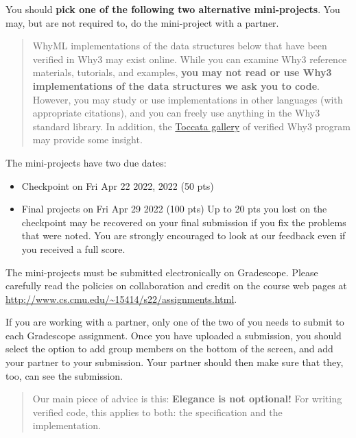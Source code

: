 \documentclass[11pt]{article}
\newcommand{\lecurl}{http://www.cs.cmu.edu/~15414/s22}
\begin{document}
\maketitle

You should \textbf{pick one of the following two alternative
  mini-projects}.  You may, but are not required to, do the mini-project
with a partner.

\begin{quote}
  WhyML implementations of the data structures below that have been
  verified in Why3 may exist online.  While you can examine Why3
  reference materials, tutorials, and examples, \textbf{you may not
    read or use Why3 implementations of the data structures we ask you
    to code}.  However, you may study or use implementations in other
  languages (with appropriate citations), and you can
  freely use anything in the Why3 standard library.  In addition, the
  \href{http://toccata.lri.fr/gallery/why3.en.html}{Toccata gallery}
  of verified Why3 program may provide some insight.
\end{quote}
The mini-projects have two due dates:
\begin{itemize}
\item Checkpoint on Fri Apr 22 2022, 2022 (50 pts)
\item Final projects on Fri Apr 29 2022 (100 pts) \newline
  Up to 20 pts you lost on the checkpoint may be recovered
  on your final submission if you fix the problems that were noted.
  You are strongly encouraged to look at our feedback even if you
  received a full score.
\end{itemize}

The mini-projects must be submitted electronically on Gradescope.
Please carefully read the policies on collaboration and credit on the
course web pages at \url{\lecurl/assignments.html}.

If you are working with a partner, only one of the two of you needs to
submit to each Gradescope assignment.  Once you have uploaded a
submission, you should select the option to add group members on the
bottom of the screen, and add your partner to your submission.  Your
partner should then make sure that they, too, can see the submission.

\begin{quote}
  Our main piece of advice is this: {\color{red}\textbf{Elegance is not
      optional!}}  For writing verified code, this applies to both:
  the specification and the implementation.
\end{quote}
\end{document}
